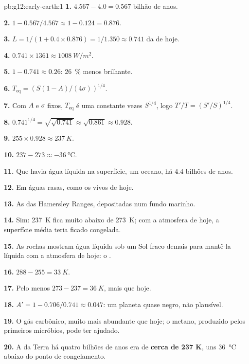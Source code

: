 \begin{solution}{pb:g12:early-earth:1}
\textbf{1.} $4.567 - 4.0 = 0.567$ bilhão de anos.

\textbf{2.} $1 - 0.567/4.567 \approx 1 - 0.124 = 0.876$.

\textbf{3.} $L = 1/(1 + 0.4 \times 0.876) = 1/1.350 \approx 0.741$ da
de hoje.

\textbf{4.} $0.741 \times 1361 \approx \qty{1008}{W/m^2}$.

\textbf{5.} $1 - 0.741 \approx 0.26$: \qty{26}{\percent} menos brilhante.

\textbf{6.} $T_{\mathrm{eq}} = \left(S(1-A)/(4\sigma)\right)^{1/4}$.

\textbf{7.} Com $A$ e $\sigma$ fixos, $T_{\mathrm{eq}}$ é uma constante vezes
$S^{1/4}$, logo $T'/T = (S'/S)^{1/4}$.

\textbf{8.} $0.741^{1/4} = \sqrt{\sqrt{0.741}} \approx \sqrt{0.861} \approx
0.928$.

\textbf{9.} $255 \times 0.928 \approx \qty{237}{K}$.

\textbf{10.} $237 - 273 \approx \qty{-36}{\celsius}$.

\textbf{11.} Que havia água líquida na superfície, um oceano, há 4.4
bilhões de anos.

\textbf{12.} Em águas rasas, como os  vivos de hoje.

\textbf{13.} As  das Hamersley Ranges,
depositadas num fundo marinho.

\textbf{14.} Sim: \qty{237}{K} fica muito abaixo de \qty{273}{K}; com a
atmosfera de hoje, a superfície média teria ficado congelada.

\textbf{15.} As rochas mostram água líquida sob um Sol fraco demais para
mantê-la líquida com a atmosfera de hoje: o .

\textbf{16.} $288 - 255 = \qty{33}{K}$.

\textbf{17.} Pelo menos $273 - 237 = \qty{36}{K}$, mais que hoje.

\textbf{18.} $A' = 1 - 0.706/0.741 \approx 0.047$: um planeta quase negro,
não plausível.

\textbf{19.} O gás carbônico, muito mais abundante que hoje; o metano,
produzido pelos primeiros micróbios, pode ter ajudado.

\textbf{20.} A  da Terra há quatro bilhões de anos
era de \textbf{cerca de 237 K}, uns \qty{36}{\celsius} abaixo do ponto de
congelamento.
\end{solution}
